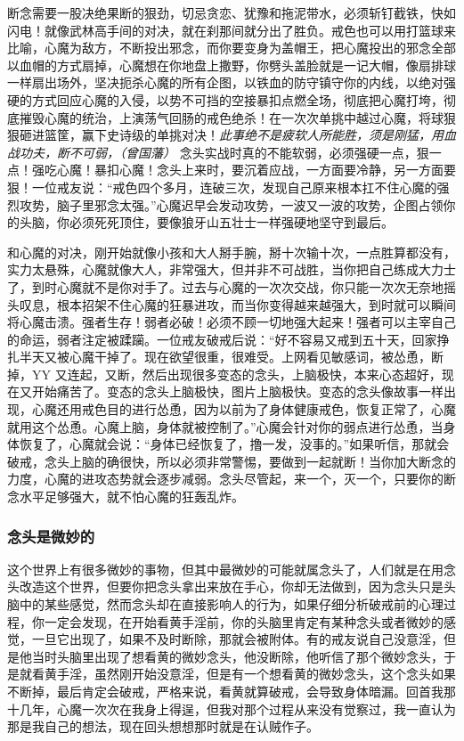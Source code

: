 断念需要一股决绝果断的狠劲，切忌贪恋、犹豫和拖泥带水，必须斩钉截铁，快如闪电！就像武林高手间的对决，就在刹那间就分出了胜负。戒色也可以用打篮球来比喻，心魔为敌方，不断投出邪念，而你要变身为盖帽王，把心魔投出的邪念全部以血帽的方式扇掉，心魔想在你地盘上撒野，你劈头盖脸就是一记大帽，像扇排球一样扇出场外，坚决扼杀心魔的所有企图，以铁血的防守镇守你的内线，以绝对强硬的方式回应心魔的入侵，以势不可挡的空接暴扣点燃全场，彻底把心魔打垮，彻底摧毁心魔的统治，上演荡气回肠的戒色绝杀！在一次次单挑中越过心魔，将球狠狠砸进篮筐，赢下史诗级的单挑对决！\textit{此事绝不是疲软人所能胜，须是刚猛，用血战功夫，断不可弱，（曾国藩）} 念头实战时真的不能软弱，必须强硬一点，狠一点！强吃心魔！暴扣心魔！念头上来时，要沉着应战，一方面要冷静，另一方面要狠！一位戒友说：“戒色四个多月，连破三次，发现自己原来根本扛不住心魔的强烈攻势，脑子里邪念太强。”心魔迟早会发动攻势，一波又一波的攻势，企图占领你的头脑，你必须死死顶住，要像狼牙山五壮士一样强硬地坚守到最后。

和心魔的对决，刚开始就像小孩和大人掰手腕，掰十次输十次，一点胜算都没有，实力太悬殊，心魔就像大人，非常强大，但并非不可战胜，当你把自己练成大力士了，到时心魔就不是你对手了。过去与心魔的一次次交战，你只能一次次无奈地摇头叹息，根本招架不住心魔的狂暴进攻，而当你变得越来越强大，到时就可以瞬间将心魔击溃。强者生存！弱者必破！必须不顾一切地强大起来！强者可以主宰自己的命运，弱者注定被蹂躏。一位戒友破戒后说：“好不容易又戒到五十天，回家挣扎半天又被心魔干掉了。现在欲望很重，很难受。上网看见敏感词，被怂恿，断掉，YY 又连起，又断，然后出现很多变态的念头，上脑极快，本来心态超好，现在又开始痛苦了。变态的念头上脑极快，图片上脑极快。变态的念头像故事一样出现，心魔还用戒色目的进行怂恿，因为以前为了身体健康戒色，恢复正常了，心魔就用这个怂恿。心魔上脑，身体就被控制了。”心魔会针对你的弱点进行怂恿，当身体恢复了，心魔就会说：“身体已经恢复了，撸一发，没事的。”如果听信，那就会破戒，念头上脑的确很快，所以必须非常警惕，要做到一起就断！当你加大断念的力度，心魔的进攻态势就会逐步减弱。念头尽管起，来一个，灭一个，只要你的断念水平足够强大，就不怕心魔的狂轰乱炸。

\subsubsection{念头是微妙的}

这个世界上有很多微妙的事物，但其中最微妙的可能就属念头了，人们就是在用念头改造这个世界，但要你把念头拿出来放在手心，你却无法做到，因为念头只是头脑中的某些感觉，然而念头却在直接影响人的行为，如果仔细分析破戒前的心理过程，你一定会发现，在开始看黄手淫前，你的头脑里肯定有某种念头或者微妙的感觉，一旦它出现了，如果不及时断除，那就会被附体。有的戒友说自己没意淫，但是他当时头脑里出现了想看黄的微妙念头，他没断除，他听信了那个微妙念头，于是就看黄手淫，虽然刚开始没意淫，但是有一个想看黄的微妙念头，这个念头如果不断掉，最后肯定会破戒，严格来说，看黄就算破戒，会导致身体暗漏。回首我那十几年，心魔一次次在我身上得逞，但我对那个过程从来没有觉察过，我一直认为那是我自己的想法，现在回头想想那时就是在认贼作子。

